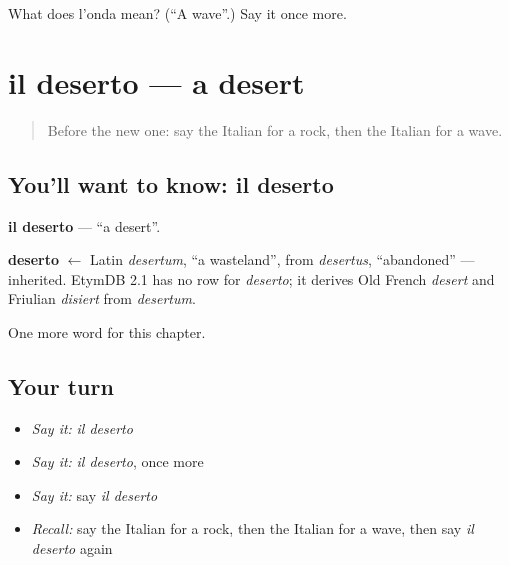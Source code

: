 \begin{tcolorbox}[breakable,colback=teal!4,colframe=teal!35!black,title={Before you move on}]
What does l'onda mean? (\textquotedblleft{}A wave\textquotedblright{}.) Say it once more.
\end{tcolorbox}
\section[il deserto]{il deserto — a desert}

\label{lesson:IT-C119-deserto}



\begin{quote}
Before the new one: say the Italian for a rock, then the Italian for a wave.
\end{quote}

\subsection*{You'll want to know: il deserto}
\textbf{il deserto} — \textquotedblleft{}a desert\textquotedblright{}.

\begin{cousinweb}
\textbf{deserto} $\leftarrow$ Latin \emph{desertum}, \textquotedblleft{}a wasteland\textquotedblright{}, from \emph{desertus}, \textquotedblleft{}abandoned\textquotedblright{} — inherited. EtymDB 2.1 has no row for \emph{deserto}; it derives Old French \emph{desert} and Friulian \emph{disiert} from \emph{desertum}.
\end{cousinweb}

\begin{grammarlens}[title={What you've built}]
One more word for this chapter.
\end{grammarlens}

\subsection*{Your turn}
\begin{itemize}
\raggedright
  \item \emph{Say it:} \emph{il deserto}
  \item \emph{Say it:} \emph{il deserto}, once more
  \item \emph{Say it:} say \emph{il deserto}
  \item \emph{Recall:} say the Italian for a rock, then the Italian for a wave, then say \emph{il deserto} again
\end{itemize}

